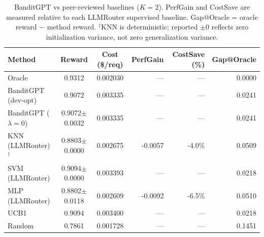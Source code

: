 \begin{table}[htbp]
\centering
\caption{BanditGPT vs peer-reviewed baselines ($K{=}2$). PerfGain and CostSave are measured relative to each LLMRouter supervised baseline. Gap@Oracle = oracle reward $-$ method reward. $^\dagger$KNN is deterministic; reported $\pm$0 reflects zero initialization variance, not zero generalization variance.}
\label{tab:summary_k2}
\small
\begin{tabular}{lccrrr}
\toprule
Method & Reward & Cost (\$/req) & PerfGain & CostSave (\%) & Gap@Oracle \\
\midrule
Oracle & 0.9312 & 0.002030 & --- & --- & 0.0000 \\
BanditGPT (dev-opt) & 0.9072 & 0.003335 & --- & --- & 0.0241 \\
BanditGPT ($\lambda{=}0$) & 0.9072$\pm$0.0032 & 0.003335 & --- & --- & 0.0241 \\
KNN (LLMRouter)$^\dagger$ & 0.8803$\pm$0.0000 & 0.002675 & -0.0057 & -4.0\% & 0.0509 \\
SVM (LLMRouter) & 0.9094$\pm$0.0000 & 0.003393 & --- & --- & 0.0218 \\
MLP (LLMRouter) & 0.8802$\pm$0.0118 & 0.002609 & -0.0092 & -6.5\% & 0.0510 \\
UCB1 & 0.9094 & 0.003400 & --- & --- & 0.0218 \\
Random & 0.7861 & 0.001728 & --- & --- & 0.1451 \\
\bottomrule
\end{tabular}
\end{table}
